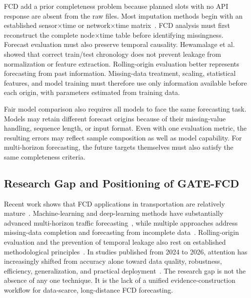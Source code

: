 \documentclass[pdflatex,sn-mathphys-num,iicol]{sn-jnl}
\begin{document}
FCD add a prior completeness problem because planned slots with no API response are absent from the raw files. Most imputation methods begin with an established sensor$\times$time or network$\times$time matrix~\cite{Chen2024TrafficCompletion,Bikram2024Imputation,Wang2024RoadNetworkPixelization}. FCD analysis must first reconstruct the complete node$\times$time table before identifying missingness. Forecast evaluation must also preserve temporal causality. Hewamalage et al.~\cite{Hewamalage2023ForecastEvaluation} showed that correct train/test chronology does not prevent leakage from normalization or feature extraction. Rolling-origin evaluation better represents forecasting from past information. Missing-data treatment, scaling, statistical features, and model training must therefore use only information available before each origin, with parameters estimated from training data.

Fair model comparison also requires all models to face the same forecasting task. Models may retain different forecast origins because of their missing-value handling, sequence length, or input format. Even with one evaluation metric, the resulting errors may reflect sample composition as well as model capability. For multi-horizon forecasting, the future targets themselves must also satisfy the same completeness criteria.



\subsection{Research Gap and Positioning of GATE-FCD}
\label{subsec:research-gap}

Recent work shows that FCD applications in transportation are relatively mature~\cite{Zhang2025FCD,Ipekyuz2025FCD,Hadry2025TrafficForecasting,Yu2024AutoformerFCD}. Machine-learning and deep-learning methods have substantially advanced multi-horizon traffic forecasting~\cite{Cini2024DeepEnsemble,Zeb2024FeatureProjection,Liu2024SpatialTemporalTransformer}, while multiple approaches address missing-data completion and forecasting from incomplete data~\cite{Chen2024TrafficCompletion,Bikram2024Imputation,Wang2024RoadNetworkPixelization,Xu2023AGNP,Zhang2024MissingData,Qu2024TrafficPredictionImputation}. Rolling-origin evaluation and the prevention of temporal leakage also rest on established methodological principles~\cite{Hewamalage2023ForecastEvaluation}. In studies published from 2024 to 2026, attention has increasingly shifted from accuracy alone toward data quality, robustness, efficiency, generalization, and practical deployment~\cite{Du2025TrafficSurvey,Khatiriolyaee2026TrafficPrediction,Liu2026DeepLearningReview}. The research gap is not the absence of any one technique. It is the lack of a unified evidence-construction workflow for data-scarce, long-distance FCD forecasting.
\end{document}
